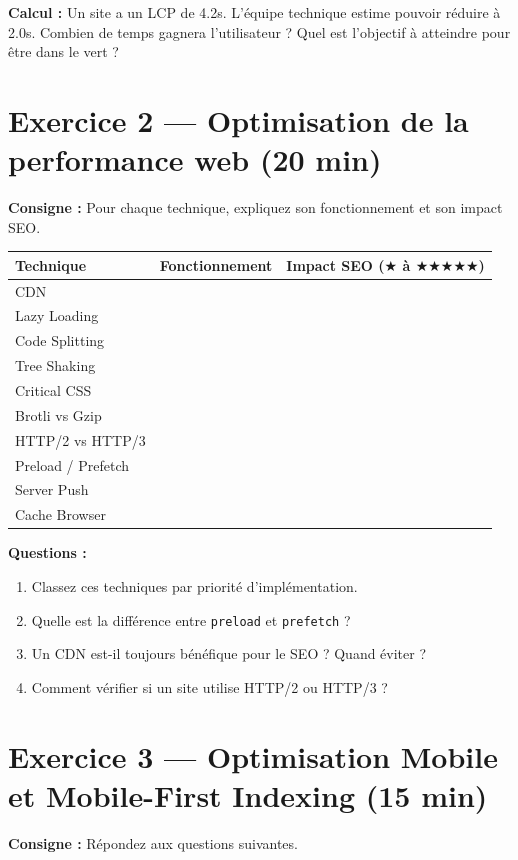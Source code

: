 \documentclass[12pt,a4paper]{report}
\begin{document}
\textbf{Calcul :} Un site a un LCP de 4.2s. L'\'{e}quipe technique estime pouvoir r\'{e}duire \`{a} 2.0s. Combien de temps gagnera l'utilisateur ? Quel est l'objectif \`{a} atteindre pour \^{e}tre dans le vert ?

\section{Exercice 2 --- Optimisation de la performance web (20 min)}

\textbf{Consigne :} Pour chaque technique, expliquez son fonctionnement et son impact SEO.

\begin{longtable}{lll}
\toprule
Technique & Fonctionnement & Impact SEO ($\bigstar$ \`{a} $\bigstar\bigstar\bigstar\bigstar\bigstar$) \\
\midrule
\endhead
\bottomrule
\endfoot
CDN & & \\
Lazy Loading & & \\
Code Splitting & & \\
Tree Shaking & & \\
Critical CSS & & \\
Brotli vs Gzip & & \\
HTTP/2 vs HTTP/3 & & \\
Preload / Prefetch & & \\
Server Push & & \\
Cache Browser & & \\
\bottomrule
\end{longtable}

\textbf{Questions :}
\begin{enumerate}
    \item Classez ces techniques par priorit\'{e} d'impl\'{e}mentation.
    \item Quelle est la diff\'{e}rence entre \texttt{preload} et \texttt{prefetch} ?
    \item Un CDN est-il toujours b\'{e}n\'{e}fique pour le SEO ? Quand \'{e}viter ?
    \item Comment v\'{e}rifier si un site utilise HTTP/2 ou HTTP/3 ?
\end{enumerate}

\section{Exercice 3 --- Optimisation Mobile et Mobile-First Indexing (15 min)}

\textbf{Consigne :} R\'{e}pondez aux questions suivantes.
\end{document}
